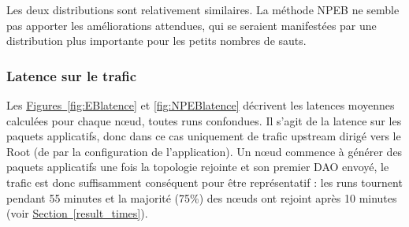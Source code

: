 \documentclass[]{report}
\newcommand{\wordlink}[2]{\hyperref[#2]{#1~\ref{#2}}}
\begin{document}
\vspace{0.2cm}

Les deux distributions sont relativement similaires. La méthode NPEB ne semble pas apporter les améliorations attendues, qui se seraient manifestées par une distribution plus importante pour les petits nombres de sauts. 

\subsubsection{Latence sur le trafic}
\label{results_latence}

Les \wordlink{Figures}{fig:EBlatence} et \ref{fig:NPEBlatence} décrivent les latences moyennes calculées pour chaque nœud, toutes runs confondues. Il s'agit de la latence sur les paquets applicatifs, donc dans ce cas uniquement de trafic upstream dirigé vers le Root (de par la configuration de l'application). Un nœud commence à générer des paquets applicatifs une fois la topologie rejointe et son premier DAO envoyé, le trafic est donc suffisamment conséquent pour être représentatif : les runs tournent pendant 55 minutes et la majorité (75\%) des nœuds ont rejoint après 10 minutes (voir \wordlink{Section}{result_times}).
\end{document}
